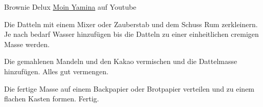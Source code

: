 \begin{recipe}[]{ Brownie Delux }{ \href{https://www.youtube.com/channel/UCR_dfR8wJBmsVkQFDa3PDcQ}{Moin Yamina} auf Youtube }



\step
Die Datteln mit einem Mixer oder Zauberstab und dem Schuss Rum zerkleinern. Je nach bedarf Wasser hinzufügen bis die Datteln zu einer einheitlichen cremigen Masse werden.

\step
Die gemahlenen Mandeln und den Kakao vermischen und die Dattelmasse hinzufügen. Alles gut vermengen.


\step
Die fertige Masse auf einem Backpapier oder Brotpapier verteilen und zu einem flachen Kasten formen. Fertig.


\end{recipe}